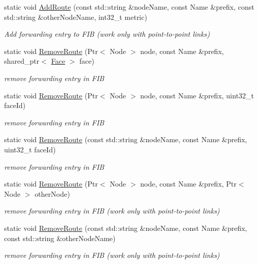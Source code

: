 \begin{DoxyCompactItemize}
static void \hyperlink{classns3_1_1ndn_1_1FibHelper_afe5ddd65288c835cb5b4018f37132b3d}{Add\+Route} (const std\+::string \&node\+Name, const Name \&prefix, const std\+::string \&other\+Node\+Name, int32\+\_\+t metric)
\begin{DoxyCompactList}\small\item\em Add forwarding entry to F\+IB (work only with point-\/to-\/point links) \end{DoxyCompactList}\item 
static void \hyperlink{classns3_1_1ndn_1_1FibHelper_ad6d4c9ad806d5b422f57b462c4f42381}{Remove\+Route} (Ptr$<$ Node $>$ node, const Name \&prefix, shared\+\_\+ptr$<$ \hyperlink{classnfd_1_1Face}{Face} $>$ face)
\begin{DoxyCompactList}\small\item\em remove forwarding entry in F\+IB \end{DoxyCompactList}\item 
static void \hyperlink{classns3_1_1ndn_1_1FibHelper_af8cb88c84215e665d2f934d8251184bb}{Remove\+Route} (Ptr$<$ Node $>$ node, const Name \&prefix, uint32\+\_\+t face\+Id)
\begin{DoxyCompactList}\small\item\em remove forwarding entry in F\+IB \end{DoxyCompactList}\item 
static void \hyperlink{classns3_1_1ndn_1_1FibHelper_a6953d832c56c432a11b8434c070bbbcd}{Remove\+Route} (const std\+::string \&node\+Name, const Name \&prefix, uint32\+\_\+t face\+Id)
\begin{DoxyCompactList}\small\item\em remove forwarding entry in F\+IB \end{DoxyCompactList}\item 
static void \hyperlink{classns3_1_1ndn_1_1FibHelper_a824a5ea72eff5c969e6bbae3c1ac828f}{Remove\+Route} (Ptr$<$ Node $>$ node, const Name \&prefix, Ptr$<$ Node $>$ other\+Node)
\begin{DoxyCompactList}\small\item\em remove forwarding entry in F\+IB (work only with point-\/to-\/point links) \end{DoxyCompactList}\item 
static void \hyperlink{classns3_1_1ndn_1_1FibHelper_a6880d8af70290120840ddc758cc3a323}{Remove\+Route} (const std\+::string \&node\+Name, const Name \&prefix, const std\+::string \&other\+Node\+Name)
\begin{DoxyCompactList}\small\item\em remove forwarding entry in F\+IB (work only with point-\/to-\/point links) \end{DoxyCompactList}\end{DoxyCompactItemize}


